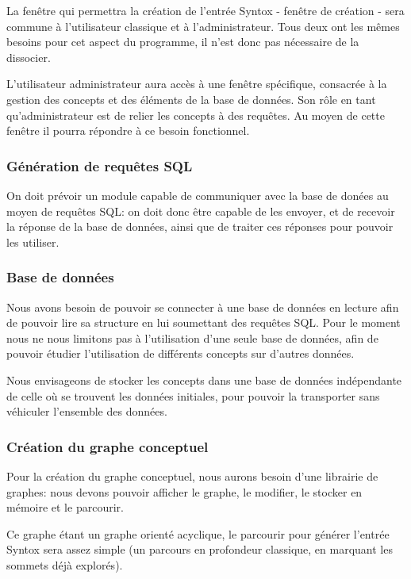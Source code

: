 \documentclass[12pt]{report}
\begin{document}
La fenêtre qui permettra la création de l'entrée Syntox - fenêtre de création - sera commune à l'utilisateur classique et à l'administrateur. Tous deux ont les mêmes besoins pour cet aspect du programme, il n'est donc pas nécessaire de la dissocier.

\bigskip

L'utilisateur administrateur aura accès à une fenêtre spécifique, consacrée à la gestion des concepts et des éléments de la base de données. Son rôle en tant qu'administrateur est  de relier les concepts à des requêtes. Au moyen de cette fenêtre il pourra répondre à ce besoin fonctionnel.

\subsubsection{Génération de requêtes SQL}

On doit prévoir un module capable de communiquer avec la base de donées au moyen de requêtes SQL: on doit donc être capable de les envoyer, et de recevoir la réponse de la base de données, ainsi que de traiter ces réponses pour pouvoir les utiliser.

\subsubsection{Base de données}

Nous avons besoin de pouvoir se connecter à une base de données en lecture afin de pouvoir lire sa structure en lui soumettant des requêtes SQL. Pour le moment nous ne nous limitons pas à l'utilisation d'une seule base de données, afin de pouvoir étudier l'utilisation de différents concepts sur d'autres données.

Nous envisageons de stocker les concepts dans une base de données indépendante de celle où se trouvent les données initiales, pour pouvoir la transporter sans véhiculer l'ensemble des données.

\subsubsection{Création du graphe conceptuel}

Pour la création du graphe conceptuel, nous aurons besoin d'une librairie de graphes:
nous devons pouvoir afficher le graphe, le modifier, le stocker en mémoire et le parcourir.

Ce graphe étant un graphe orienté acyclique, le parcourir pour générer l'entrée Syntox sera assez simple (un parcours en profondeur classique, en marquant les sommets déjà explorés).
  
\end{document}
